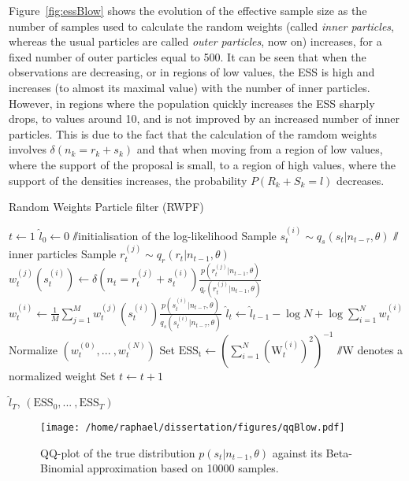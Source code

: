 \documentclass[12pt]{article}
\begin{document}
	Figure~\ref{fig:essBlow} shows the evolution of the effective sample size as the number of samples used to calculate the random weights (called \emph{inner particles}, whereas the usual particles are called \emph{outer particles}, now on) increases, for a fixed number of outer particles equal to 500. It can be seen that when the observations are decreasing, or in regions of low values, the ESS is high and increases (to almost its maximal value) with the number of inner particles. However, in regions where the population quickly increases the ESS sharply drops, to values around 10, and is not improved by an increased number of inner particles. This is due to the fact that the calculation of the ramdom weights involves $\delta(n_k = r_k+s_k)$ and that when moving from a region of low values, where the support of the proposal is small, to a region of high values, where the support of the densities increases, the probability $P(R_k+S_k=l)$ decreases. \\
	\vspace{-2mm}
	\begin{algorithm}
		\caption{Random Weights Particle filter (RWPF)}\label{RWPF}
		\begin{algorithmic}[1]
			\State $t \gets 1$
			\State $\hat{l}_0 \gets 0$ $\sslash$initialisation of the log-likelihood
			\State Sample $s_t^{(i)} \sim q_s(s_t| n_{t-\tau}, \theta)$
			 $\sslash$inner particles
			\State Sample $r_t^{(j)} \sim q_r(r_t| n_{t-1}, \theta)$
			\State $w_t^{(j)}(s_t^{(i)}) \gets \delta(n_t=r_t^{(j)}+s_t^{(i)})\frac{p(r_t^{(j)}| n_{t-1}, \theta)}{q_r(r_t^{(j)}| n_{t-1}, \theta)}$
			\EndFor
			\State $w_t^{(i)} \gets \frac{1}{M}\sum_{j=1}^{M}w_t^{(j)}(s_t^{(i)}) \frac{p(s_t^{(i)}| n_{t-\tau}, \theta)}{q_s(s_t^{(i)}| n_{t-\tau}, \theta)}$
			\EndFor
			\State $\hat{l}_t \gets \hat{l}_{t-1} - \log N + \log\sum_{i=1}^{N}w_t^{(i)}$
			\State Normalize $(w_t^{(0)}, \text{...}\ , w_t^{(N)})$
			\State Set $\mathrm{ESS_t} \gets (\sum_{i=1}^{N}(\mathrm{W}_t^{(i)})^2)^{-1}$ $\sslash$W denotes a normalized weight
			\State Set $t \gets t+1$
			\EndWhile
			\item[]
			\Return $\hat{l}_T$,  $(\mathrm{ESS}_0, \text{...}\ , \mathrm{ESS}_T)$
			\EndFunction
		\end{algorithmic}
	\end{algorithm}
	\vspace{5mm}
	\begin{figure}[htb]
		\centering
		\begin{minipage}{0.47\textwidth}
			\centering
			\texttt{[image: /home/raphael/dissertation/figures/qqBlow.pdf]}
		\end{minipage}
		\caption[QQ-plot of the true distribution $p(s_t | n_{t-1}, \theta)$ against its Beta-Binomial approximation.]{QQ-plot of the true distribution $p(s_t | n_{t-1}, \theta)$ against its Beta-Binomial approximation based on 10000 samples.}
		\label{fig:qqBlow}
	\end{figure}
	
\end{document}
